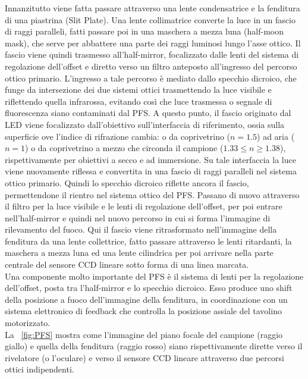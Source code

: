\begin{itemize}
Innanzitutto viene fatta passare attraverso una lente condensatrice e la fenditura di una piastrina (Slit Plate). Una lente collimatrice converte la luce in un fascio di raggi paralleli, fatti passare poi in una maschera a mezza luna (half-moon mask), che serve per abbattere una parte dei raggi luminosi lungo l'asse ottico. Il fascio viene quindi trasmesso all'half-mirror, focalizzato dalle lenti del sistema di regolazione dell'offset e diretto verso un filtro anteposto all'ingresso del percorso ottico primario. L'ingresso a tale percorso è mediato dallo specchio dicroico, che funge da intersezione dei due sistemi ottici trasmettendo la luce visibile e riflettendo quella infrarossa, evitando così che luce trasmessa o segnale di fluorescenza siano contaminati dal PFS. A questo punto, il fascio originato dal LED viene focalizzato dall'obiettivo sull'interfaccia di riferimento, ossia sulla superficie ove l'indice di rifrazione cambia: o da coprivetrino ($n=1.5$) ad aria ($n=1$) o da coprivetrino a mezzo che circonda il campione ($1.33\leq n \geq 1.38$), rispettivamente per obiettivi a secco e ad immersione. Su tale interfaccia la luce viene nuovamente riflessa e convertita in una fascio di raggi paralleli nel sistema ottico primario. Quindi lo specchio dicroico riflette ancora il fascio, permettendone il rientro nel sistema ottico del PFS. Passano di nuovo attraverso il filtro per la luce visibile e le lenti di regolazione dell'offset, per poi entrare nell'half-mirror e quindi nel nuovo percorso in cui si forma l'immagine di rilevamento del fuoco. Qui il fascio viene ritrasformato nell'immagine della fenditura da una lente collettrice, fatto passare attraverso le lenti ritardanti, la maschera a mezza luna ed una lente cilindrica per poi arrivare nella parte centrale del sensore CCD lineare sotto forma di una linea marcata.  \\
Una componente molto importante del PFS è il sistema di lenti per la regolazione dell'offset, posta tra l'half-mirror e lo specchio dicroico. Esso produce uno shift della posizione a fuoco dell'immagine della fenditura, in coordinazione con un sistema elettronico di feedback che controlla la posizione assiale del tavolino motorizzato. \\
La \figurename~\ref{fig:PFS} mostra come l'immagine del piano focale del campione (raggio giallo) e quella della fenditura (raggio rosso) siano rispettivamente dirette verso il rivelatore (o l'oculare) e verso il sensore CCD lineare attraverso due percorsi ottici indipendenti. 


\end{itemize}
